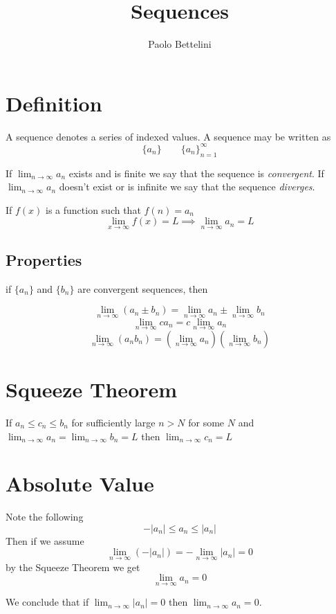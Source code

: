 \documentclass[a4paper]{article}
\title{Sequences}
\author{Paolo Bettelini}
\date{}
\begin{document}
\maketitle
\tableofcontents
\pagebreak

\section{Definition}

A sequence denotes a series of indexed values.
A sequence may be written as
\[
    \{a_n\} \quad \quad {\{a_n\}}_{n=1}^\infty
\]

If \(\lim_{n \to \infty}a_n\) exists and is finite
we say that the sequence is \textit{convergent}. If 
\(\lim_{n \to \infty}a_n\) doesn't exist or is infinite
we say that the sequence \textit{diverges}.

If \(f(x)\) is a function such that \(f(n)=a_n\)
\[
    \lim_{x\to\infty}f(x)=L \implies
    \lim_{n\to\infty}a_n=L
\]

\subsection{Properties}

if \(\{a_n\}\) and \(\{b_n\}\) are convergent sequences, then

\[
    \lim_{n\to\infty} (a_n \pm b_n) = \lim_{n\to\infty} a_n \pm
    \lim_{n\to\infty} b_n
\]
\[
    \lim_{n\to\infty} ca_n = c \lim_{n\to\infty} a_n
\]
\[
    \lim_{n\to\infty} (a_n b_n) =
    \left(\lim_{n\to\infty} a_n\right)
    \left(\lim_{n\to\infty} b_n\right)
\]

\section{Squeeze Theorem}

If \(a_n \leq c_n \leq b_n\) for sufficiently large \(n>N\) for some \(N\)
and \(\lim_{n\to\infty}a_n =\lim_{n\to\infty}b_n=L\)
then \(\lim_{n\to\infty} c_n =L\)

\section{Absolute Value}

Note the following
\[
    -|a_n| \leq a_n \leq |a_n|
\]
Then if we assume
\[
    \lim_{n\to\infty} (-|a_n|) = - \lim_{n\to\infty} |a_n| =0 
\]
by the Squeeze Theorem we get
\[
    \lim_{n\to\infty} a_n =0
\]

We conclude that if \(\lim_{n\to\infty} |a_n|=0\) then
\(\lim_{n\to\infty} a_n=0\).
\end{document}
